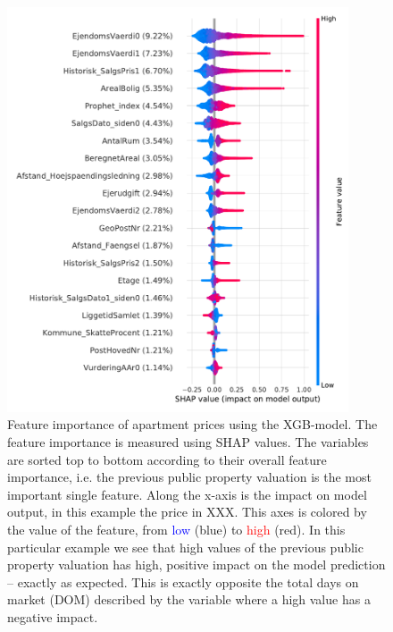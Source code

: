 \begin{figure}[ht!]
  \centerfloat
  \includegraphics[width=0.9\textwidth, trim=0 0 0 1, clip]{figures/housing/Ejerlejlighed_v19_cut_all_Ncols_all_xgb_tight_SHAP_vals_summary.pdf}
  \caption[Feature importance of apartments prices using XGB]
          {Feature importance of apartment prices using the XGB-model. The feature importance is measured using SHAP values. The variables are sorted top to bottom according to their overall feature importance, i.e. the previous public property valuation  is the most important single feature. Along the x-axis is the impact on model output, in this example the price in XXX. This axes is colored by the value of the feature, from \textcolor{blue}{low} (blue) to \textcolor{red}{high} (red). In this particular example we see that high values of the previous public property valuation has high, positive impact on the model prediction -- exactly as expected. This is exactly opposite the total days on market (DOM) described by the variable  where a high value has a negative impact.  
          } 
  \label{fig:h:shap_overview}
\end{figure}

